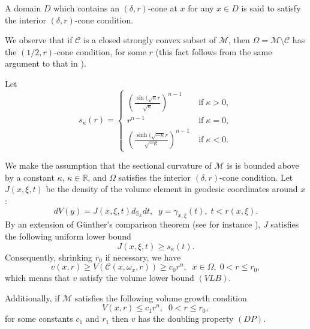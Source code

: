 \documentclass{birkjour}
\begin{document}
\smallskip
A domain $D$ which contains an $(\delta ,r)$-cone at $x$ for any $x \in D$ is said to satisfy
the interior $(\delta ,r)$-cone condition.

\smallskip
We observe that if $\mathcal{C}$ is a closed strongly convex subset of $\mathcal{M}$, then $\Omega =\mathcal{M}\setminus \mathcal{C}$ has the $(1/2 ,r)$-cone condition, for some $r$ (this fact follows from the same argument to that in \cite[Example 8.1, page 370]{Sa}).

\smallskip
Let
\[
s_\kappa (r)=\left\{
\begin{array}{ll}
\left(\frac{\sin (\sqrt{\kappa}r}{\sqrt{\kappa}}\right)^{n-1}\;\; &\textrm{if}\; \kappa >0,
\\
r^{n-1} &\textrm{if}\; \kappa =0,
\\
\left(\frac{\sinh (\sqrt{-\kappa}r}{\sqrt{-\kappa}}\right)^{n-1}\  &\textrm{if}\; \kappa <0.
\end{array}
\right.
\]

\smallskip
We make the assumption that the sectional curvature of $\mathcal{M}$ is is bounded above by a constant $\kappa$, $\kappa \in \mathbb{R}$,  and $\Omega$  satisfies the interior $(\delta ,r)$-cone condition. Let $J(x,\xi ,t)$ be the density of the volume element in geodesic coordinates around $x$:
\[
dV(y)=J(x,\xi ,t)d_{\mathbb{S}_x}dt,\;\; y=\gamma _{x,\xi}(t),\; t<r(x,\xi ).
\]
By an extension of G\"unther's comparison theorem (see for instance \cite{KK}),  $J$ satisfies the following uniform lower bound
\[
J(x,\xi ,t)\geq s_\kappa (t).
\]
Consequently, shrinking $r_0$ if necessary, we have
\begin{equation}\label{ce}
v(x,r)\geq V (\mathscr{C}(x,\omega _x,r))\geq c_0 r^n,\;\; x\in \Omega ,\; 0<r\leq r_0 ,
\end{equation}
which means that $v$ satisfy the volume lower bound $(VLB)$.

\smallskip
Additionally, if  $\mathcal{M}$ satisfies the following volume growth condition 
\begin{equation}\label{vgc}
V(x,r)\leq c_1r^n, \;\; 0<r\leq r_0,
\end{equation}
for some constants $c_1$ and $r_1$ then $v$ has the doubling property $(DP)$.
\end{document}
